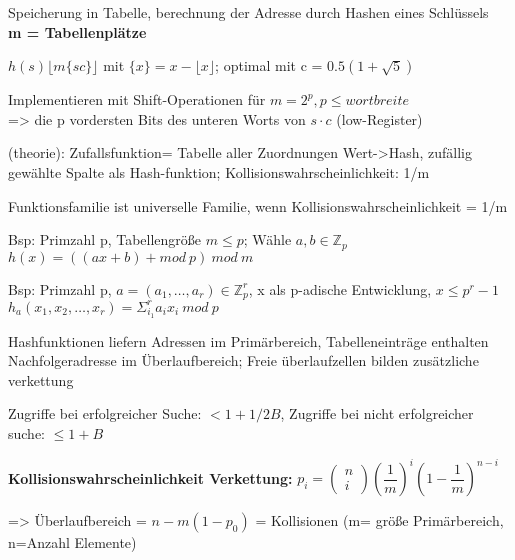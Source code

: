 Speicherung in Tabelle, berechnung der Adresse durch Hashen eines Schlüssels \\
\textbf{m = Tabellenplätze}


$h(s) \lfloor m \lbrace sc \rbrace \rfloor$ mit $ \lbrace x \rbrace  = x - \lfloor x \rfloor$;
optimal mit c = $0.5(1+\sqrt{5})$ 

Implementieren mit Shift-Operationen für $m = 2^p, p\leq wortbreite$\\
=> die p vordersten Bits des unteren Worts von $s\cdot c$ (low-Register)


(theorie): Zufallsfunktion= Tabelle aller Zuordnungen Wert->Hash, zufällig gewählte Spalte als Hash-funktion;
Kollisionswahrscheinlichkeit: 1/m

Funktionsfamilie ist universelle Familie, wenn Kollisionswahrscheinlichkeit = 1/m

Bsp: Primzahl p, Tabellengröße $m \leq p$; Wähle $a,b \in \mathbb{Z}_p$\\
$h(x) = ((ax+b)+mod~ p )~ mod~ m$

Bsp: Primzahl p, $a=(a_1,\dots,a_r) \in \mathbb{Z}_p^r$, x als p-adische Entwicklung, $x \leq p^r-1$\\
$h_a( x_1, x_2, \dots ,x_r ) = \Sigma_{i_1}^r a_i x_i ~mod ~p$

Hashfunktionen liefern Adressen im Primärbereich, Tabelleneinträge enthalten Nachfolgeradresse im Überlaufbereich; Freie überlaufzellen bilden zusätzliche verkettung


Zugriffe bei erfolgreicher Suche: $<1+1/2B$, Zugriffe bei nicht erfolgreicher suche: $\leq 1+ B$

\textbf{Kollisionswahrscheinlichkeit Verkettung:} $p_i = \left( \begin{array}{c}n \\ i\end{array} \right) \left( \dfrac{1}{m} \right)^i \left( 1- \dfrac{1}{m} \right)^{n-i} $

=> Überlaufbereich = $n-m(1-p_0)$  =  Kollisionen (m= größe Primärbereich, n=Anzahl Elemente) 

